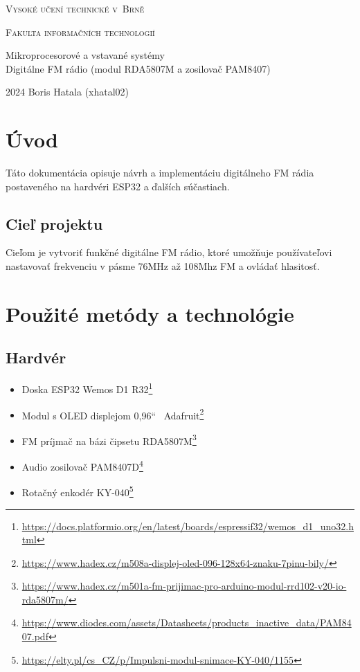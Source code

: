 \documentclass[11pt, a4paper]{article}
\begin{document}
\begin{titlepage}
\thispagestyle{empty}

    \begin{center}

        {\Huge \textsc{Vysoké učení technické v~Brně \\[0.5em]}}

        {\huge \textsc{Fakulta informačních technologií}}


        {\Large Mikroprocesorové a vstavané systémy \\[0.5em]
        \LARGE Digitálne FM rádio (modul RDA5807M a zosilovač PAM8407) 
         }


    \end{center}
{\Large 2024 \hfill Boris Hatala (xhatal02)}

\end{titlepage}

\newpage
\tableofcontents
\newpage


\section{Úvod}
Táto dokumentácia opisuje návrh a implementáciu digitálneho FM rádia postaveného 
na hardvéri ESP32 a ďalších súčastiach.

\subsection{Cieľ projektu}
Cieľom je vytvoriť funkčné digitálne FM rádio, 
ktoré umožňuje používateľovi nastavovať frekvenciu v pásme 76MHz až 108Mhz FM a 
ovládať hlasitosť.

\section{Použité metódy a technológie}
\subsection{Hardvér}
\begin{itemize}
    \item Doska ESP32 Wemos D1 R32\footnote{\url{https://docs.platformio.org/en/latest/boards/espressif32/wemos_d1_uno32.html}}
    \item Modul s OLED displejom 0,96`` \-\ Adafruit\footnote{\url{https://www.hadex.cz/m508a-displej-oled-096-128x64-znaku-7pinu-bily/}}
    \item FM príjmač na bázi čipsetu RDA5807M\footnote{\url{https://www.hadex.cz/m501a-fm-prijimac-pro-arduino-modul-rrd102-v20-io-rda5807m/}}
    \item Audio zosilovač PAM8407D\footnote{\url{https://www.diodes.com/assets/Datasheets/products_inactive_data/PAM8407.pdf}}
    \item Rotačný enkodér KY-040\footnote{\url{https://elty.pl/cs_CZ/p/Impulsni-modul-snimace-KY-040/1155}}
\end{itemize}
\end{document}
